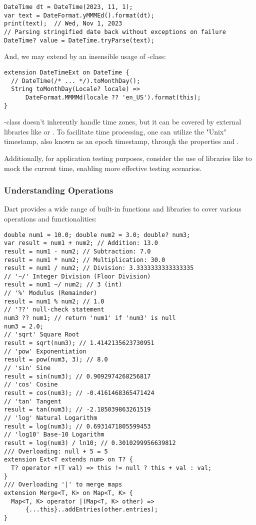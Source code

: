 \begin{lstlisting}
DateTime dt = DateTime(2023, 11, 1);
var text = DateFormat.yMMMEd().format(dt);
print(text);  // Wed, Nov 1, 2023
// Parsing stringified date back without exceptions on failure
DateTime? value = DateTime.tryParse(text);
\end{lstlisting}

\noindent And, we may extend  by an insensible usage of -class:

\begin{lstlisting}
extension DateTimeExt on DateTime {
  // DateTime(/* ... */).toMonthDay(); 
  String toMonthDay(Locale? locale) =>
      DateFormat.MMMMd(locale ?? 'en_US').format(this);
}
\end{lstlisting}

\noindent {}-class doesn't inherently handle time zones, but it can be covered by external libraries like 
 or . To facilitate time processing, one can utilize the "Unix" timestamp, also known as an epoch 
timestamp, through the properties  and . 
 
Additionally, for application testing purposes, consider the use of libraries like  to mock the 
current time, enabling more effective testing scenarios.

\newpage
\subsubsection{Understanding Operations}

Dart provides a wide range of built-in functions and libraries to cover various operations and functionalities:

\begin{lstlisting}
double num1 = 10.0; double num2 = 3.0; double? num3;
var result = num1 + num2; // Addition: 13.0
result = num1 - num2; // Subtraction: 7.0
result = num1 * num2; // Multiplication: 30.0
result = num1 / num2; // Division: 3.3333333333333335
// '~/' Integer Division (Floor Division)
result = num1 ~/ num2; // 3 (int)
// '%' Modulus (Remainder)
result = num1 % num2; // 1.0
// '??' null-check statement
num3 ?? num1; // return 'num1' if 'num3' is null
num3 = 2.0;
// 'sqrt' Square Root
result = sqrt(num3); // 1.4142135623730951
// 'pow' Exponentiation
result = pow(num3, 3); // 8.0
// 'sin' Sine
result = sin(num3); // 0.9092974268256817
// 'cos' Cosine
result = cos(num3); // -0.4161468365471424
// 'tan' Tangent
result = tan(num3); // -2.185039863261519
// 'log' Natural Logarithm
result = log(num3); // 0.6931471805599453
// 'log10' Base-10 Logarithm
result = log(num3) / ln10; // 0.3010299956639812
/// Overloading: null + 5 = 5
extension Ext<T extends num> on T? {
  T? operator +(T val) => this != null ? this + val : val;
}
/// Overloading '|' to merge maps
extension Merge<T, K> on Map<T, K> {
  Map<T, K> operator |(Map<T, K> other) => 
      {...this}..addEntries(other.entries);
}
\end{lstlisting}

